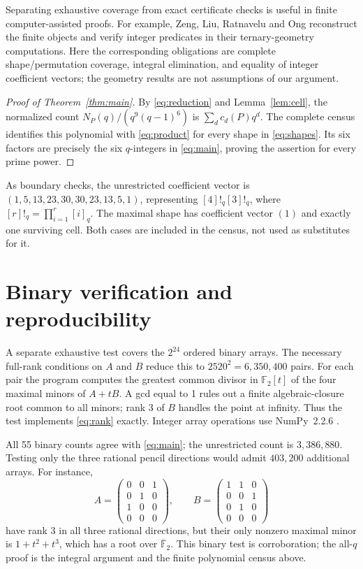 \documentclass[11pt]{article}
\newcommand{\F}{\mathbb F}
\begin{document}
Separating exhaustive coverage from exact certificate checks is useful
in finite computer-assisted proofs. For example, Zeng, Liu, Ratnavelu
and Ong \cite{ZengCertificates} reconstruct the finite
objects and verify integer predicates in their ternary-geometry
computations. Here the corresponding obligations are complete
shape/permutation coverage, integral elimination, and equality of
integer coefficient vectors; the geometry results are not assumptions
of our argument.

\begin{proof}[Proof of Theorem~\ref{thm:main}]
By \eqref{eq:reduction} and Lemma~\ref{lem:cell}, the normalized count
$N_P(q)/(q^9(q-1)^6)$ is $\sum_d c_d(P)q^d$.
The complete census identifies this polynomial with \eqref{eq:product}
for every shape in \eqref{eq:shapes}. Its six factors are precisely the
six $q$-integers in \eqref{eq:main}, proving the assertion for every
prime power.
\end{proof}

As boundary checks, the unrestricted coefficient vector is
$(1,5,13,23,30,30,23,13,5,1)$, representing $[4]!_q[3]!_q$, where
$[r]!_q=\prod_{i=1}^r[i]_q$. The maximal shape has coefficient vector
$(1)$ and exactly one surviving cell. Both cases are included in the
census, not used as substitutes for it.

\section{Binary verification and reproducibility}

A separate exhaustive test covers the $2^{24}$ ordered binary arrays.
The necessary full-rank conditions on $A$ and $B$ reduce this to
$2520^2=6{,}350{,}400$ pairs. For each pair the program computes the
greatest common divisor in $\F_2[t]$ of the four maximal minors of
$A+tB$. A gcd equal to 1 rules out a finite algebraic-closure root
common to all minors; rank 3 of $B$ handles the point at infinity.
Thus the test implements \eqref{eq:rank} exactly. Integer array
operations use NumPy~2.2.6 \cite{NumPy}.

All 55 binary counts agree with \eqref{eq:main}; the unrestricted count
is $3{,}386{,}880$. Testing only the three rational pencil directions
would admit $403{,}200$ additional arrays. For instance,
\[
 A=\begin{pmatrix}0&0&1\\0&1&0\\1&0&0\\0&0&0\end{pmatrix},\qquad
 B=\begin{pmatrix}1&1&0\\0&0&1\\0&1&0\\0&0&0\end{pmatrix}
\]
have rank 3 in all three rational directions, but their only nonzero
maximal minor is $1+t^2+t^3$, which has a root over $\overline{\F}_2$.
This binary test is corroboration; the all-$q$ proof is the integral
argument and the finite polynomial census above.
\end{document}

